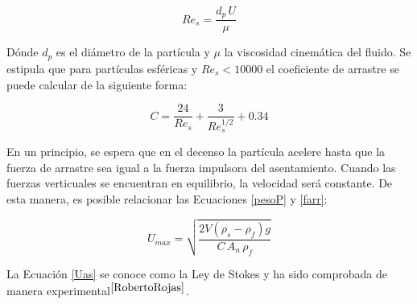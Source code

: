 \begin{equation}
	Re _s = \frac{d_p \, U}{\mu}
	\label{Res}
\end{equation}

\noindent
\justify

D\'onde $d_p$ es el di\'ametro de la part\'icula y $\mu$ la viscosidad cinem\'atica del fluido. Se estipula que para part\'iculas esf\'ericas y $Re _s < 10000$ el coeficiente de arrastre se puede calcular de la siguiente forma:

\begin{equation}
	C = \frac{24}{Re_s} + \frac{3}{Re _s ^{1/2}} + 0.34
	\label{CoefArr}
\end{equation}

\noindent
\justify

En un principio, se espera que en el decenso la part\'icula acelere hasta que la fuerza de arrastre sea igual a la fuerza impulsora del asentamiento. Cuando las fuerzas verticuales se encuentran en equilibrio, la velocidad ser\'a constante. De esta manera, es posible relacionar las Ecuaciones \ref{pesoP} y \ref{farr}:

\begin{equation}
	U_{max} = \sqrt{\frac{2 V \left(\rho _s - \rho _f \right) g}{C \, A_n \, \rho _f}}
	\label{Uas}
\end{equation}

\noindent
\justify

La Ecuaci\'on \ref{Uas} se conoce como la Ley de Stokes y ha sido comprobada de manera experimental$^{\cite{RobertoRojas}}$. 